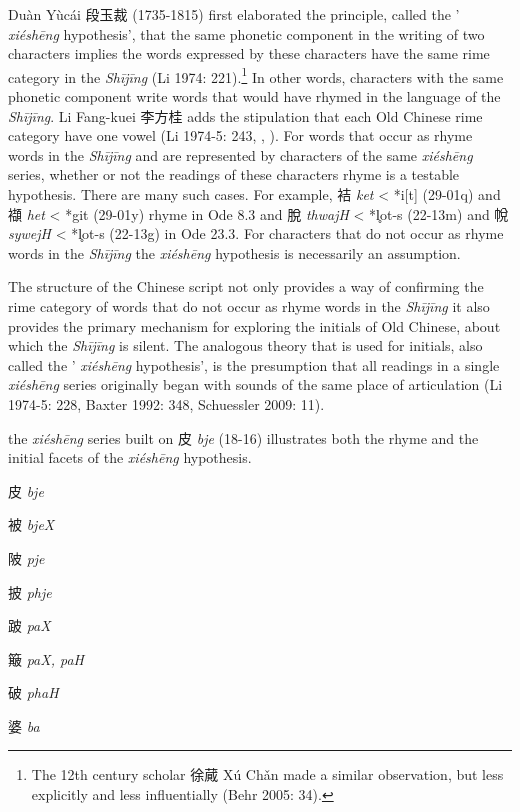 Duàn Yùcái 段玉裁 (1735-1815) first elaborated the principle, called the
' \emph{xiéshēng} hypothesis', that the same phonetic component in the
writing of two characters implies the words expressed by these
characters have the same rime category in the \emph{Shījīng} (Li 1974:
221).\footnote{The 12th century scholar 徐蕆 Xú Chǎn made a similar
  observation, but less explicitly and less influentially (Behr 2005:
  34).} In other words, characters with the same phonetic component
write words that would have rhymed in the language of the
 \emph{Shījīng}. Li Fang-kuei 李方桂 adds the stipulation that each Old
Chinese rime category have one vowel (Li 1974-5: 243, 
\cite[348]{Baxter1992},
\cite[11]{Schuessler2009minimal}). For words that occur as rhyme words in the
 \emph{Shījīng} and are represented by characters of the same
 \emph{xiéshēng} series, whether or not the readings of these characters
rhyme is a testable hypothesis. There are many such cases. For example,
袺  \emph{ket} \textless{} *{}i{[}t] (29-01q) and 襭  \emph{het}
\textless{} *g{}it (29-01y) rhyme in Ode 8.3 and 脫 \emph{thwajH}
\textless{} *l̥{}ot-s (22-13m) and 帨 \emph{sywejH} \textless{} *l̥ot-s
(22-13g) in Ode 23.3. For characters that do not occur as rhyme words in
the \emph{Shījīng} the \emph{xiéshēng} hypothesis is necessarily an
assumption.

The structure of the Chinese script not only provides a way of
confirming the rime category of words that do not occur as rhyme words
in the \emph{Shījīng} it also provides the primary mechanism for
exploring the initials of Old Chinese, about which the \emph{Shījīng} is
silent. The analogous theory that is used for initials, also called the
' \emph{xiéshēng} hypothesis', is the presumption that all readings in a
single \emph{xiéshēng} series originally began with sounds of the same
place of articulation (Li 1974-5: 228, Baxter 1992: 348, Schuessler
2009: 11).

the \emph{xiéshēng} series built on 皮  \emph{bje} (18-16) illustrates
both the rhyme and the initial facets of the \emph{xiéshēng} hypothesis.

\begin{description} \item
皮  \emph{bje}

\item
被  \emph{bjeX}

\item
陂  \emph{pje}

\item
披  \emph{phje}

\item
跛  \emph{paX}

\item
簸  \emph{paX, paH}

\item
破  \emph{phaH}

\item
婆  \emph{ba}
\end{description}

